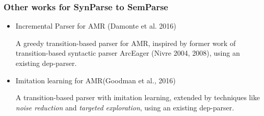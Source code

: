 \documentclass{beamer}
\begin{document}
\begin{frame}
    \frametitle{Other works for SynParse to SemParse}

    \begin{itemize}
        \item Incremental Parser for AMR (Damonte et al. 2016)

            A greedy transition-based parser for AMR, inspired by former work of
            transition-based syntactic parser ArcEager (Nivre 2004, 2008),
            using an existing dep-parser.

        \item Imitation learning for AMR(Goodman et al., 2016)

            A transition-based parser with imitation learning, extended by techniques
            like \emph{noise reduction} and \emph{targeted exploration},
            using an existing dep-parser.

    \end{itemize}
\end{frame}
\end{document}
